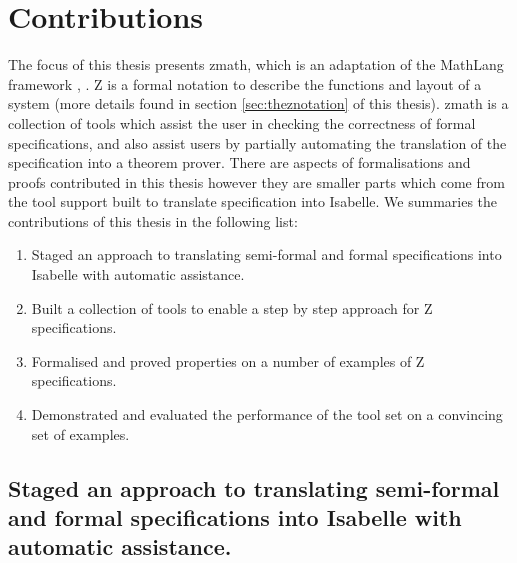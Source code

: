%
%

\section{Contributions}

The focus of this thesis presents \gls{zmath}, which is an adaptation of the
MathLang framework \cite{newmathlang}, \cite{wtt}. Z is a formal notation to
describe the functions and layout of a system (more details found in section
\ref{sec:theznotation} of this thesis). \Gls{zmath} is a collection of tools
which assist the user in checking the correctness of formal specifications, and
also assist users by partially automating the translation of the specification
into a theorem prover. There are aspects of formalisations and proofs
contributed in this thesis however they are smaller parts which come from the
tool support built to translate specification into Isabelle. We summaries the
contributions of this thesis in the following list:

\begin{enumerate}
\item Staged an approach to translating semi-formal and formal specifications
into Isabelle with automatic assistance.
\item Built a collection of tools to enable a step by step approach for Z
specifications.
\item Formalised and proved properties on a number of examples of Z
specifications.
\item Demonstrated and evaluated the performance of the tool set on a convincing
set of examples.
\end{enumerate}

\subsection{Staged an approach to translating semi-formal and formal specifications into Isabelle with automatic assistance.}

